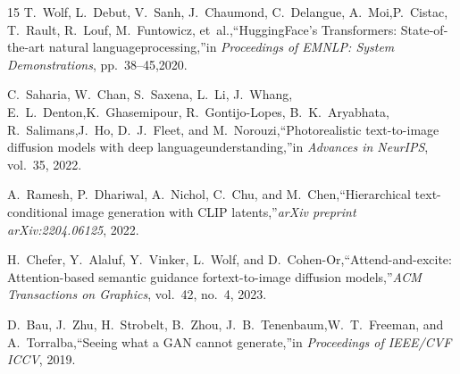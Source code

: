 \documentclass[conference]{IEEEtran}
\begin{document}
\begin{thebibliography}{15}
T.~Wolf, L.~Debut, V.~Sanh, J.~Chaumond, C.~Delangue, A.~Moi,P.~Cistac, T.~Rault, R.~Louf, M.~Funtowicz, et~al.,``HuggingFace's Transformers: State-of-the-art natural languageprocessing,''in \textit{Proceedings of EMNLP: System Demonstrations}, pp.~38--45,2020.

C.~Saharia, W.~Chan, S.~Saxena, L.~Li, J.~Whang, E.~L.~Denton,K.~Ghasemipour, R.~Gontijo-Lopes, B.~K.~Aryabhata, R.~Salimans,J.~Ho, D.~J.~Fleet, and M.~Norouzi,``Photorealistic text-to-image diffusion models with deep languageunderstanding,''in \textit{Advances in NeurIPS}, vol.~35, 2022.

A.~Ramesh, P.~Dhariwal, A.~Nichol, C.~Chu, and M.~Chen,``Hierarchical text-conditional image generation with CLIP latents,''\textit{arXiv preprint arXiv:2204.06125}, 2022.

H.~Chefer, Y.~Alaluf, Y.~Vinker, L.~Wolf, and D.~Cohen-Or,``Attend-and-excite: Attention-based semantic guidance fortext-to-image diffusion models,''\textit{ACM Transactions on Graphics}, vol.~42, no.~4, 2023.

D.~Bau, J.~Zhu, H.~Strobelt, B.~Zhou, J.~B.~Tenenbaum,W.~T.~Freeman, and A.~Torralba,``Seeing what a GAN cannot generate,''in \textit{Proceedings of IEEE/CVF ICCV}, 2019.\end{thebibliography}
\end{document}
